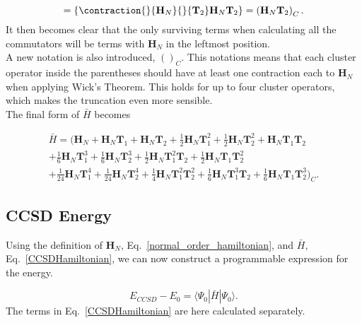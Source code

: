 \documentclass[graybox,sectrefs,envcountresetchap,open=right]{svmonodo}
\begin{document}
\begin{equation}
[\mathbf{H}_N, \mathbf{T}_2] = 
\{
\contraction{}{\mathbf{H}_N}{}{\mathbf{T}_2}
\mathbf{H}_N\mathbf{T}_2\} 
= \left( \mathbf{H}_N \mathbf{T}_2 \right)_C
.
\end{equation} 
It then becomes clear that the only surviving terms when calculating all the commutators will be terms with $\mathbf{H}_N$ in the leftmost position. \\

A new notation is also introduced, $()_C$. This notations means that each cluster operator inside the parentheses should have at least one contraction each to $\mathbf{H}_N$ when applying Wick's Theorem. This holds for up to four cluster operators, which makes the truncation even more sensible. \\

The final form of $\bar{H}$ becomes

\begin{equation}
\begin{split}
\bar{H} = 
\big( \mathbf{H}_N + \mathbf{H}_N \mathbf{T}_1 + \mathbf{H}_N \mathbf{T}_2
+ \frac{1}{2} \mathbf{H}_N \mathbf{T}_1^2
+ \frac{1}{2} \mathbf{H}_N \mathbf{T}_2^2
+ \mathbf{H}_N \mathbf{T}_1 \mathbf{T}_2 \\
+ \frac{1}{6} \mathbf{H}_N \mathbf{T}_1^3
+ \frac{1}{6} \mathbf{H}_N \mathbf{T}_2^3
+ \frac{1}{2} \mathbf{H}_N \mathbf{T}_1^2 \mathbf{T}_2
+ \frac{1}{2} \mathbf{H}_N \mathbf{T}_1 \mathbf{T}_2^2 \\ 
+ \frac{1}{24} \mathbf{H}_N \mathbf{T}_1^4
+ \frac{1}{24} \mathbf{H}_N \mathbf{T}_2^4
+ \frac{1}{4} \mathbf{H}_N \mathbf{T}_1^2 \mathbf{T}_2^2
+ \frac{1}{6} \mathbf{H}_N \mathbf{T}_1^3 \mathbf{T}_2
+ \frac{1}{6} \mathbf{H}_N \mathbf{T}_1 \mathbf{T}_2^3 \big)_C  .
\end{split} \label{CCSDHamiltonian}
\end{equation} 

\subsection{CCSD Energy}
Using the definition of $\mathbf{H}_N$, Eq.~\ref{normal_order_hamiltonian}, and $\bar{H}$, Eq.~\ref{CCSDHamiltonian}, we can now construct a programmable expression for the energy. 

\begin{equation}
E_{CCSD} - E_0 = \langle \Psi_0 | \bar{H} | \Psi_0 \rangle .
\end{equation} 
The terms in Eq.~\ref{CCSDHamiltonian} are here calculated separately. 
\end{document}

